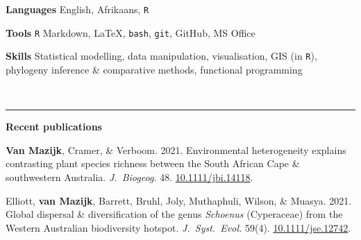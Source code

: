 \documentclass[12pt]{article}
\begin{document}
\bigskip

\textbf{Languages}     \hfill                  English, Afrikaans, \texttt{R}

\textbf{Tools    }     \hfill                            \texttt{R} Markdown,
                                        {\selectfont \LaTeX},
                               \texttt{bash}, \texttt{git}, GitHub, MS Office

\textbf{Skills  }      \hfill Statistical modelling, data manipulation, visualisation, GIS (in \texttt{R}), \\
                       \hfill phylogeny inference \& comparative methods, functional programming

\

\hrule %

\bigskip

{\large \textbf{Recent publications}}

\bigskip

\textbf{Van Mazijk}, Cramer, \& Verboom.
2021.
Environmental heterogeneity explains contrasting plant species richness between the South African Cape \& southwestern Australia.
\textit{J.~Biogeog.} 48.
\href{https://doi.org/10.1111/jbi.14118}{10.1111/jbi.14118}.

\bigskip

Elliott, \textbf{van Mazijk}, Barrett, Bruhl, Joly, Muthaphuli, Wilson, \& Muasya.
2021.
Global dispersal \& diversification of the genus \textit{Schoenus} (Cyperaceae) from the Western Australian biodiversity hotspot.
\textit{J.~Syst.~Evol.} 59(4).
\href{https://doi.org/10.1111/jse.1274}{10.1111/jse.12742}.
\end{document}
